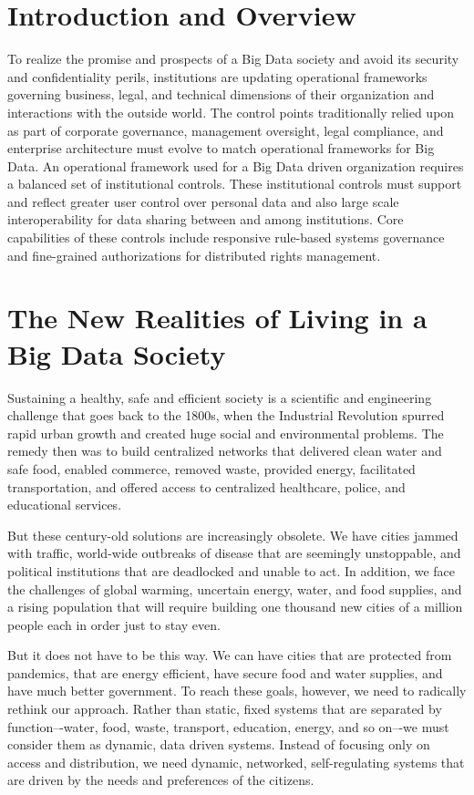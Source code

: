 \section{Introduction and Overview}

To realize the promise and prospects of a Big Data society and avoid its security and confidentiality perils, institutions are updating operational frameworks governing business, legal, and technical dimensions of their organization and interactions with the outside world.
The control points traditionally relied upon as part of corporate governance, management oversight, legal compliance, and enterprise architecture must evolve to match operational frameworks for Big Data.
An operational framework used for a Big Data driven organization requires a balanced set of institutional controls.
These institutional controls must support and reflect greater user control over personal data and also large scale interoperability for data sharing between and among institutions.
Core capabilities of these controls include responsive rule-based systems governance and fine-grained authorizations for distributed rights management.

\section{The New Realities of Living in a Big Data Society}

Sustaining a healthy, safe and efficient society is a scientific and engineering challenge that goes back to the 1800s, when the Industrial Revolution spurred rapid urban growth and created huge social and environmental problems.
The remedy then was to build centralized networks that delivered clean water and safe food, enabled commerce, removed waste, provided energy, facilitated transportation, and offered access to centralized healthcare, police, and educational services.

But these century-old solutions are increasingly obsolete.
We have cities jammed with traffic, world-wide outbreaks of disease that are seemingly unstoppable, and political institutions that are deadlocked and unable to act.
In addition, we face the challenges of global warming, uncertain energy, water, and food supplies, and a rising population that will require building one thousand new cities of a million people each in order just to stay even. 

But it does not have to be this way.
We can have cities that are protected from pandemics, that are energy efficient, have secure food and water supplies, and have much better government.
To reach these goals, however, we need to radically rethink our approach.
Rather than static, fixed systems that are separated by function–-water, food, waste, transport, education, energy, and so on–-we must consider them as dynamic, data driven systems.
Instead of focusing only on access and distribution, we need dynamic, networked, self-regulating systems that are driven by the needs and preferences of the citizens.

